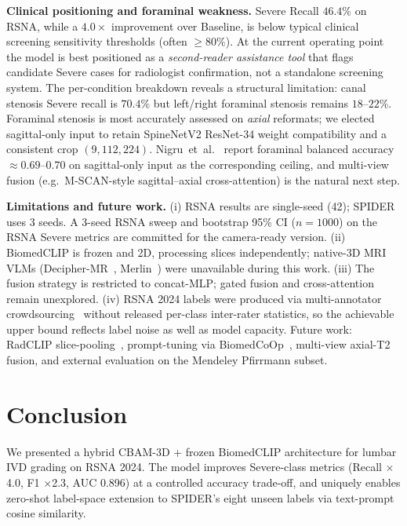 \documentclass[runningheads]{llncs}
\begin{document}
\textbf{Clinical positioning and foraminal weakness.}
Severe Recall $46.4\%$ on RSNA, while a $4.0\times$ improvement
over Baseline, is below typical clinical screening sensitivity
thresholds (often $\geq 80\%$). At the current operating point the
model is best positioned as a \emph{second-reader assistance tool}
that flags candidate Severe cases for radiologist confirmation,
not a standalone screening system. The per-condition breakdown
reveals a structural limitation: canal stenosis Severe recall is
$70.4\%$ but left/right foraminal stenosis remains $18$--$22\%$.
Foraminal stenosis is most accurately assessed on \emph{axial}
reformats; we elected sagittal-only input to retain SpineNetV2
ResNet-34 weight compatibility and a consistent crop $(9, 112,
224)$. Nigru~et~al.~\cite{nigru2024} report foraminal balanced
accuracy $\approx 0.69$--$0.70$ on sagittal-only input as the
corresponding ceiling, and multi-view fusion (e.g.\ M-SCAN-style
sagittal--axial cross-attention) is the natural next step.

\textbf{Limitations and future work.}
(i) RSNA results are single-seed (42); SPIDER uses 3 seeds. A
3-seed RSNA sweep and bootstrap 95\% CI ($n=1000$) on the RSNA
Severe metrics are committed for the camera-ready version.
(ii) BiomedCLIP is frozen and 2D, processing slices independently;
native-3D MRI VLMs (Decipher-MR~\cite{yang2026deciphermr},
Merlin~\cite{blankemeier2026merlin}) were unavailable during this
work. (iii) The fusion strategy is restricted to concat-MLP; gated
fusion and cross-attention remain unexplored.
(iv) RSNA 2024 labels were produced via multi-annotator
crowdsourcing~\cite{kaggle2024} without released per-class
inter-rater statistics, so the achievable upper bound reflects
label noise as well as model capacity. Future work: RadCLIP
slice-pooling~\cite{lu2024radclip}, prompt-tuning via
BiomedCoOp~\cite{koleilat2025biomedcoop}, multi-view axial-T2
fusion, and external evaluation on the Mendeley Pfirrmann subset.

\section{Conclusion}
\label{sec:concl}
We presented a hybrid CBAM-3D + frozen BiomedCLIP architecture for
lumbar IVD grading on RSNA 2024. The model improves Severe-class
metrics (Recall $\times$4.0, F1 $\times$2.3, AUC 0.896) at a
controlled accuracy trade-off, and uniquely enables zero-shot
label-space extension to SPIDER's eight unseen labels via
text-prompt cosine similarity.
\end{document}
